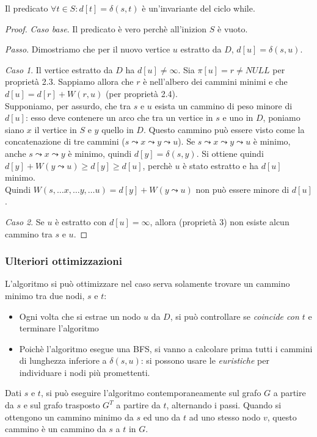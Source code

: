 \documentclass[11pt]{book}
\begin{document}
Il predicato $\forall t \in S : d[t]=\delta(s,t)$ è un'invariante del ciclo while.
\begin{proof}
    \textit{Caso base}. Il predicato è vero perchè all'inizion $S$ è vuoto.

    \textit{Passo}. Dimostriamo che per il nuovo vertice $u$ estratto da $D$, $d[u]=\delta(s,u)$.

    \textit{Caso 1}. Il vertice estratto da $D$ ha $d[u]\neq \infty$. Sia $\pi[u]=r\neq NULL$ per proprietà 2.3. Sappiamo 
    allora che $r$ è nell'albero dei cammini minimi e che $d[u]=d[r]+W(r,u)$ (per proprietà 2.4).\\
    Supponiamo, per assurdo, che tra $s$ e $u$ esista un cammino di peso minore di $d[u]$: esso deve contenere un arco che 
    tra un vertice in $s$ e uno in $D$, poniamo siano $x$ il vertice in $S$ e $y$ quello in $D$. Questo cammino può essere 
    visto come la concatenazione di tre cammini ($s\leadsto x\leadsto y \leadsto u$). Se $s\leadsto x\leadsto y \leadsto u$ 
    è minimo, anche $s\leadsto x\leadsto y$ è minimo, quindi $d[y]=\delta(s,y)$. Si ottiene quindi $d[y]+W(y\leadsto u)\geq d[y]\geq d[u]$,
    perchè $u$ è stato estratto e ha $d[u]$ minimo.\\
    Quindi $W(s,\dots x,\dots y,\dots u)=d[y]+W(y\leadsto u)$ non può essere minore di $d[u]$.

    \textit{Caso 2}. Se $u$ è estratto con $d[u]=\infty$, allora (proprietà 3) non esiste alcun cammino tra $s$ e $u$.
\end{proof} 
\subsubsection{Ulteriori ottimizzazioni}
L'algoritmo si può ottimizzare nel caso serva solamente trovare un cammino minimo tra due nodi, $s$ e $t$:
\begin{itemize}
    \item Ogni volta che si estrae un nodo $u$ da $D$, si può controllare se \textit{coincide con $t$} e terminare l'algoritmo 
    \item Poichè l'algoritmo esegue una BFS, si vanno a calcolare prima tutti i cammini di lunghezza inferiore a $\delta(s,u)$:
    si possono usare le \textit{euristiche} per individuare i nodi più promettenti.
\end{itemize}
Dati $s$ e $t$, si può eseguire l'algoritmo contemporaneamente sul grafo $G$ a partire da $s$ e sul grafo trasposto $G^T$ 
a partire da $t$, alternando i passi. Quando si ottengono un cammino minimo da $s$ ed uno da $t$ ad uno stesso nodo $v$,
questo cammino è un cammino da $s$ a $t$ in $G$.
\end{document}
